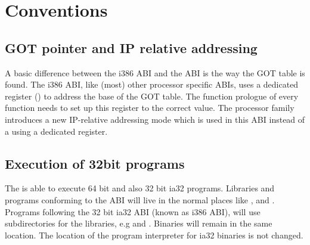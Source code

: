 
\chapter{Conventions}



\section{GOT pointer and IP relative addressing}

A basic difference between the i386 ABI and the \xARCH ABI is the
way the GOT table is found.  The i386 ABI, like (most) other processor
specific ABIs, uses a dedicated register () to address the
base of the GOT table.  The function prologue of every function needs
to set up this register to the correct value.  The \xARCH processor
family introduces a new IP-relative addressing mode which is used in
this ABI instead of a using a dedicated register.

\section{Execution of 32bit programs}


The \xARCH is able to execute 64 bit \xARCH and also 32 bit ia32
programs.  Libraries and programs conforming to the \xARCH ABI will
live in the normal places like ,  and
.  Programs following the 32 bit ia32 ABI (known as
i386 ABI), will use  subdirectories for the libraries, e.g
 and .  Binaries will remain in
the same location.  The location of the program interpreter for ia32
binaries is not changed.


